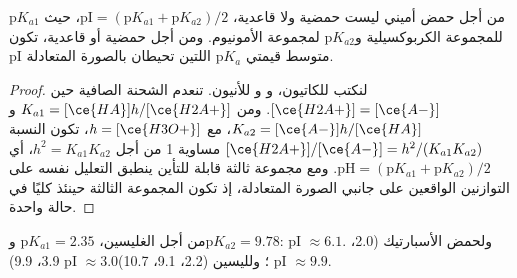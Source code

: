 \begin{proposition}\label{prop:b2:biomolecules:pi}
من أجل حمض أميني  ليست حمضية ولا قاعدية، $\mathrm{pI} = (\mathrm pK_{a1} +
\mathrm pK_{a2})/2$، حيث $\mathrm pK_{a1}$ للمجموعة الكربوكسيلية و$\mathrm pK_{a2}$ لمجموعة
الأمونيوم. ومن أجل  حمضية أو قاعدية، تكون pI متوسط قيمتي $\mathrm pK_a$ اللتين تحيطان
بالصورة المتعادلة.
\end{proposition}

\begin{proof}
لنكتب  للكاتيون، و  و للأنيون. تنعدم الشحنة الصافية
حين $[\ce{H2A+}] = [\ce{A-}]$. ومن $K_{a1} = [\ce{HA}]h/[\ce{H2A+}]$ و$K_{a2} =
[\ce{A-}]h/[\ce{HA}]$، مع $h = [\ce{H3O+}]$، تكون النسبة $[\ce{H2A+}]/[\ce{A-}] = h^2/(K_{a1}K_{a2})$
مساوية 1 من أجل $h^2 = K_{a1}K_{a2}$، أي $\mathrm{pH} = (\mathrm pK_{a1} + \mathrm pK_{a2})/2$. ومع
مجموعة ثالثة قابلة للتأين ينطبق التعليل نفسه على التوازنين الواقعين على جانبي الصورة
المتعادلة، إذ تكون المجموعة الثالثة حينئذ كليًا في حالة واحدة.
\end{proof}

من أجل الغليسين، $\mathrm pK_{a1} = 2.35$ و$\mathrm pK_{a2} = 9.78$: pI $\approx 6.1$. ولحمض الأسبارتيك
(2.0، 3.9، 9.9) pI $\approx 3.0$؛ ولليسين (2.2، 9.1، 10.7) pI $\approx 9.9$.

